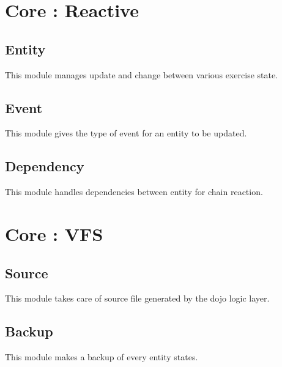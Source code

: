 \section{Core : Reactive}
	\subsection{Entity}
		This module manages update and change between various exercise state.
	\subsection{Event}
		This module gives the type of event for an entity to be updated.
	\subsection{Dependency}
		This module handles dependencies between entity for chain reaction.
		 
\section{Core : VFS}
	\subsection{Source}
		This module takes care of source file generated by the dojo logic layer.
	\subsection{Backup}
		This module makes a backup of every entity states.
		
		
		